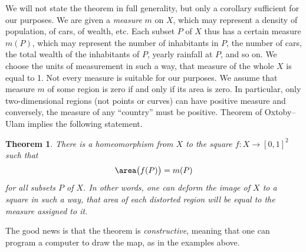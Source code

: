 \documentclass{amsart}
\newtheorem*{theorem}{Theorem}
\begin{document}
We will not state the theorem in full generality, but only a corollary
sufficient for our purposes. We are given a \textit{measure} $m$ on $X$,
which may represent a density of population, of cars, of wealth,
etc. Each subset $P$ of $X$ thus has a certain measure%
$m(P)$, which may represent the
number of inhabitants in $P$, the number of cars, the total wealth of
the inhabitants of $P$, yearly rainfall at $P$, and so on. We choose
the units of measurement in such a way, that measure of the whole $X$
is equal to 1. Not every measure is suitable for our purposes. We
assume that measure $m$ of some region is zero if and only if its area
is zero. In particular, only two-dimensional regions (not points or
curves) can have positive measure and conversely, the measure of any
``country'' must be positive. Theorem of Oxtoby--Ulam%
implies the following statement.
\begin{theorem}
  There is a \textit{homeomorphism}%
  from $X$ to the square $f:X\to[0,1]^{2}$ such that
  \[
    \area\big(f(P)\big)=m(P)
  \]
for all subsets $P$ of $X$. In other words, one can deform the image
of $X$ to a square in such a way, that area of each distorted
region will be equal to the measure assigned to it.
\end{theorem}
The good news is that the theorem is \textit{constructive}, meaning
that one can program a computer to draw the map, as in the examples
above.
\end{document}
